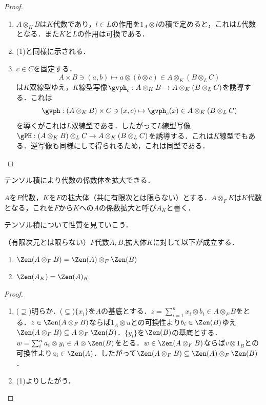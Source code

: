 \documentclass[a4paper,11pt]{jsarticle}
\begin{document}
\begin{proof}
  \begin{enumerate}
    \item $A\otimes_K B$は$K$代数であり，$l\in L$の作用を$1_A\otimes l$の積で定めると，これは$L$代数となる．また$K$と$L$の作用は可換である．
    \item (1)と同様に示される．
    \item $c\in C$を固定する．
          \[
            A\times B\ni (a,b)\mapsto a\otimes (b\otimes c)\in A\otimes_K (B\otimes_L C)
          \]
          は$K$双線型ゆえ，$K$線型写像$\gvph_c:A\otimes_K B\to A\otimes_K (B\otimes_L C)$を誘導する．これは
          \[
            \gvph:(A\otimes_K B)\times C \ni (x,c)\mapsto \gvph_c(x)\in A\otimes_K (B\otimes_L C)
          \]
          を導くがこれは$L$双線型である．したがって$L$線型写像$\gPH:(A\otimes_K B)\otimes_L C\to A\otimes_K (B\otimes_L C)$を誘導する．これは$K$線型でもある．逆写像も同様にして得られるため，これは同型である．
  \end{enumerate}
\end{proof}
テンソル積により代数の係数体を拡大できる．
\begin{prop}[係数拡大]
  $A$を$F$代数，$K$を$F$の拡大体（共に有限次とは限らない）とする．$A\otimes_F K$は$K$代数となる，これを$F$から$K$への$A$の係数拡大と呼び$A_K$と書く．
\end{prop}
テンソル積について性質を見ていこう．
\begin{lem}[テンソル積と中心]\label{lem:tensor_and_center}
  （有限次元とは限らない）$F$代数$A,B$,拡大体$K$に対して以下が成立する．
  \begin{enumerate}
    \item $\Zen(A\otimes_F B)=\Zen(A)\otimes_F\Zen(B)$
    \item $\Zen(A_K)=\Zen(A)_K$
  \end{enumerate}
\end{lem}
\begin{proof}
  \begin{enumerate}
    \item ($\supseteq$)明らか．($\subseteq$)$\{x_i\}$を$A$の基底とする．$z=\sum_{i=1}^n x_i\otimes b_i\in A\otimes_F B$をとる．$z\in\Zen(A\otimes_F B)$ならば$1_A\otimes u$との可換性より$b_i\in \Zen(B)$ゆえ$\Zen(A\otimes_F B)\subseteq A\otimes_F\Zen(B)$．$\{y_i\}$を$\Zen(B)$の基底とする．$w=\sum_i^n a_i\otimes y_i\in A\otimes \Zen(B)$をとる．$w\in\Zen(A\otimes_F B)$ならば$v\otimes 1_B$との可換性より$a_i\in \Zen(A)$．したがって$\Zen(A\otimes_F B)\subseteq\Zen(A)\otimes_F\Zen(B)$．
    \item (1)よりしたがう．
  \end{enumerate}
\end{proof}
\end{document}
